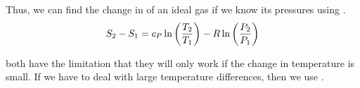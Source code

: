 Thus, we can find the change in  of an ideal gas if we know its pressures using .
\begin{equation}\label{eq:Entropy_Change-Ideal_Gases-Pressure}
  S_{2} - S_{1} = c_{P} \ln \left( \frac{T_{2}}{T_{1}} \right) - R \ln \left( \frac{P_{2}}{P_{1}} \right)
\end{equation}

\begin{blackbox}
   both have the limitation that they will only work if the change in temperature is small.
  If we have to deal with large temperature differences, then we use .
\end{blackbox}

